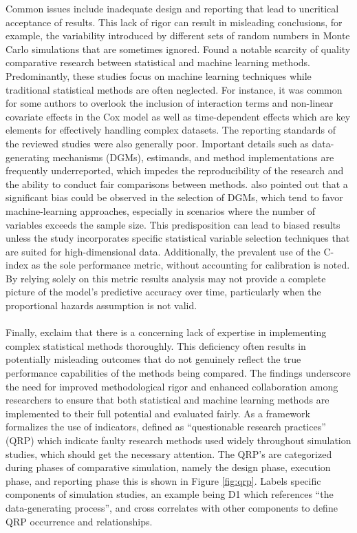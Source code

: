 Common issues include inadequate design and reporting that lead to uncritical acceptance of results. This lack of rigor can result in misleading conclusions, for example, the variability introduced by different sets of random numbers in Monte Carlo simulations that are sometimes ignored. \parencite{smith_scoping_2022} Found a notable scarcity of quality comparative research between statistical and machine learning methods. Predominantly, these studies focus on machine learning techniques while traditional statistical methods are often neglected. For instance, it was common for some authors to overlook the inclusion of interaction terms and non-linear covariate effects in the Cox model as well as time-dependent effects which are key elements for effectively handling complex datasets. The reporting standards of the reviewed studies were also generally poor. Important details such as data-generating mechanisms (DGMs), estimands, and method implementations are frequently underreported, which impedes the reproducibility of the research and the ability to conduct fair comparisons between methods. \parencite{smith_scoping_2022} also pointed out that a significant bias could be observed in the selection of DGMs, which tend to favor machine-learning approaches, especially in scenarios where the number of variables exceeds the sample size. This predisposition can lead to biased results unless the study incorporates specific statistical variable selection techniques that are suited for high-dimensional data. Additionally, the prevalent use of the C-index as the sole performance metric, without accounting for calibration is noted. By relying solely on this metric results analysis may not provide a complete picture of the model's predictive accuracy over time, particularly when the proportional hazards assumption is not valid.
\\\\
Finally, \parencite{smith_scoping_2022} exclaim that there is a concerning lack of expertise in implementing complex statistical methods thoroughly. This deficiency often results in potentially misleading outcomes that do not genuinely reflect the true performance capabilities of the methods being compared. The findings underscore the need for improved methodological rigor and enhanced collaboration among researchers to ensure that both statistical and machine learning methods are implemented to their full potential and evaluated fairly. As a framework \parencite{pawel_pitfalls_2024} formalizes the use of indicators, defined as “questionable research practices” (QRP) which indicate faulty research methods used widely throughout simulation studies, which should get the necessary attention. The QRP's are categorized during phases of comparative simulation, namely the design phase, execution phase, and reporting phase this is shown in Figure \ref{fig:qrp}. \parencite{pawel_pitfalls_2024} Labels specific components of simulation studies, an example being D1 which references “the data-generating process”, and cross correlates with other components to define QRP occurrence and relationships.


